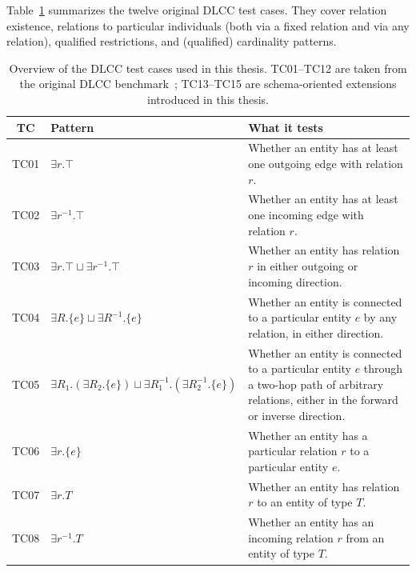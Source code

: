 \documentclass[a4paper,oneside,bibliography=totoc]{scrbook}
\begin{document}
Table~\ref{tab:dlcc-test-cases} summarizes the twelve original DLCC test cases.
They cover relation existence, relations to particular individuals (both via a
fixed relation and via any relation), qualified restrictions, and (qualified)
cardinality patterns.
\begin{table}[htbp]
\centering
\caption{Overview of the DLCC test cases used in this thesis. TC01--TC12 are
taken from the original DLCC benchmark~\cite{portisch_dlcc_2022}; TC13--TC15 are
schema-oriented extensions introduced in this thesis.}
\label{tab:dlcc-test-cases}
\footnotesize
\renewcommand{\arraystretch}{1.25}
\begin{tabularx}{\textwidth}{@{}c >{\raggedright\arraybackslash}p{} >{\raggedright\arraybackslash}X@{}}
\toprule
\textbf{TC} & \textbf{Pattern} & \textbf{What it tests} \\
\midrule

TC01 &
$\exists r.\top$
& Whether an entity has at least one outgoing edge with relation $r$. \\

TC02 &
$\exists r^{-1}.\top$
& Whether an entity has at least one incoming edge with relation $r$. \\

TC03 &
$\exists r.\top \sqcup \exists r^{-1}.\top$
& Whether an entity has relation $r$ in either outgoing or incoming direction. \\

TC04 &
$\exists R.\{e\} \sqcup \exists R^{-1}.\{e\}$
& Whether an entity is connected to a particular entity $e$ by any relation, in either direction. \\

TC05 &
$\exists R_1.(\exists R_2.\{e\}) \sqcup \exists R_1^{-1}.(\exists R_2^{-1}.\{e\})$
& Whether an entity is connected to a particular entity $e$ through a two-hop path of arbitrary relations, either in the forward or inverse direction. \\

TC06 &
$\exists r.\{e\}$
& Whether an entity has a particular relation $r$ to a particular entity $e$. \\

TC07 &
$\exists r.T$
& Whether an entity has relation $r$ to an entity of type $T$. \\

TC08 &
$\exists r^{-1}.T$
& Whether an entity has an incoming relation $r$ from an entity of type $T$. \\


\end{tabularx}
\end{table}
\end{document}
